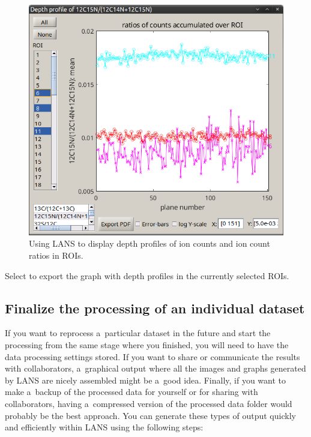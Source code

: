 \begin{figure}[!ht]
\centering
\includegraphics[scale=0.4]{figs3/LANS-depth-profiles}
\caption{\label{fig:depth-profiles}%
Using LANS to display depth profiles of ion counts and ion count ratios in ROIs.}
\end{figure}

\s Select  to export the graph with depth profiles in the currently selected ROIs.


\subsection{Finalize the processing of an individual dataset}
\label{sec:final-steps}
\setcounter{step}{0}

If you want to reprocess a~particular dataset in the future and start the processing from the same stage where you finished, you will need to have the data processing settings stored. If you want to share or communicate the results with collaborators, a~graphical output where all the images and graphs generated by LANS are nicely assembled might be a~good idea. Finally, if you want to make a~backup of the processed data for yourself or for sharing with collaborators, having a~compressed version of the processed data folder would probably be the best approach. You can generate these types of output quickly and efficiently within LANS using the following steps:

